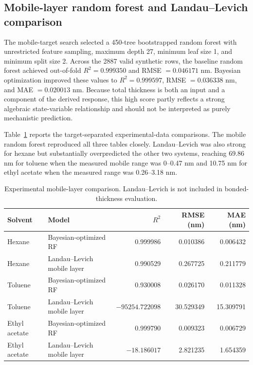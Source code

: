 \documentclass[11pt]{article}
\begin{document}
\subsection{Mobile-layer random forest and Landau--Levich comparison}
The mobile-target search selected a 450-tree bootstrapped random forest with unrestricted feature sampling, maximum depth 27, minimum leaf size 1, and minimum split size 2. Across the 2887 valid synthetic rows, the baseline random forest achieved out-of-fold $R^2=0.999350$ and RMSE $=0.046171$ nm. Bayesian optimization improved these values to $R^2=0.999597$, RMSE $=0.036338$ nm, and MAE $=0.020013$ nm. Because total thickness is both an input and a component of the derived response, this high score partly reflects a strong algebraic state-variable relationship and should not be interpreted as purely mechanistic prediction.

Table~\ref{tab:mobile-comparison} reports the target-separated experimental-data comparisons. The mobile random forest reproduced all three tables closely. Landau--Levich was also strong for hexane but substantially overpredicted the other two systems, reaching 69.86 nm for toluene when the measured mobile range was 0--0.47 nm and 10.75 nm for ethyl acetate when the measured range was 0.26--3.18 nm.

\begin{table}[H]
\centering
\caption{Experimental mobile-layer comparison. Landau--Levich is not included in bonded-thickness evaluation.}
\label{tab:mobile-comparison}
\begin{tabular}{llrrr}
\toprule
Solvent & Model & $R^2$ & RMSE (nm) & MAE (nm) \\
\midrule
Hexane & Bayesian-optimized RF & 0.999986 & 0.010386 & 0.006432 \\
Hexane & Landau--Levich mobile layer & 0.990529 & 0.267725 & 0.211779 \\
Toluene & Bayesian-optimized RF & 0.930008 & 0.026170 & 0.011328 \\
Toluene & Landau--Levich mobile layer & $-95254.722098$ & 30.529349 & 15.309791 \\
Ethyl acetate & Bayesian-optimized RF & 0.999790 & 0.009323 & 0.006729 \\
Ethyl acetate & Landau--Levich mobile layer & $-18.186017$ & 2.821235 & 1.654359 \\
\bottomrule
\end{tabular}
\end{table}
\end{document}
